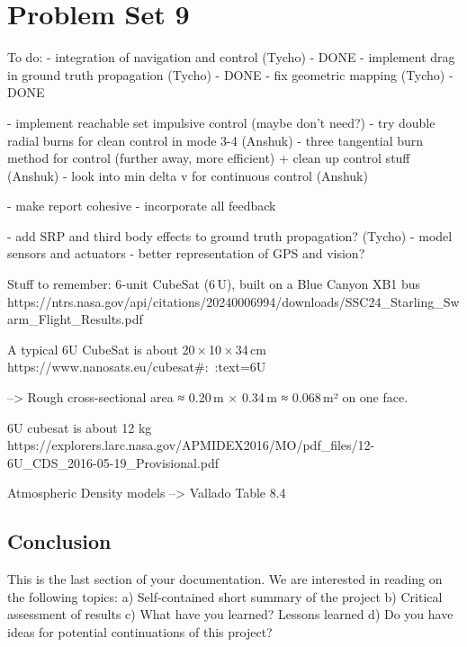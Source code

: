 \section{Problem Set 9}

To do:
- integration of navigation and control (Tycho) - DONE
- implement drag in ground truth propagation (Tycho) - DONE
- fix geometric mapping (Tycho) - DONE

- implement reachable set impulsive control (maybe don't need?)
- try double radial burns for clean control in mode 3-4 (Anshuk)
- three tangential burn method for control (further away, more efficient)
+ clean up control stuff (Anshuk)
- look into min delta v for continuous control (Anshuk)



- make report cohesive 
- incorporate all feedback

- add SRP and third body effects to ground truth propagation? (Tycho)
- model sensors and actuators
    - better representation of GPS and vision?


Stuff to remember: 
6‑unit CubeSat (6 U), built on a Blue Canyon XB1 bus 
https://ntrs.nasa.gov/api/citations/20240006994/downloads/SSC24_Starling_Swarm_Flight_Results.pdf


A typical 6U CubeSat is about 20 × 10 × 34 cm
https://www.nanosats.eu/cubesat#:~:text=6U%


--> Rough cross-sectional area ≈ 0.20 m × 0.34 m ≈ 0.068 m² on one face.

6U cubesat is about 12 kg
https://explorers.larc.nasa.gov/APMIDEX2016/MO/pdf_files/12-6U_CDS_2016-05-19_Provisional.pdf


Atmospheric Density models --> Vallado Table 8.4




\subsection{Conclusion}
This is the last section of your documentation. We are interested in reading on the
following topics:
a) Self-contained short summary of the project
b) Critical assessment of results
c) What have you learned? Lessons learned
d) Do you have ideas for potential continuations of this project?